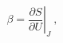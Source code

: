 \begin{equation}
\beta=\left.\frac{\partial S}{\partial U}\right|_J \ ,
\label{beta}
\end{equation}

